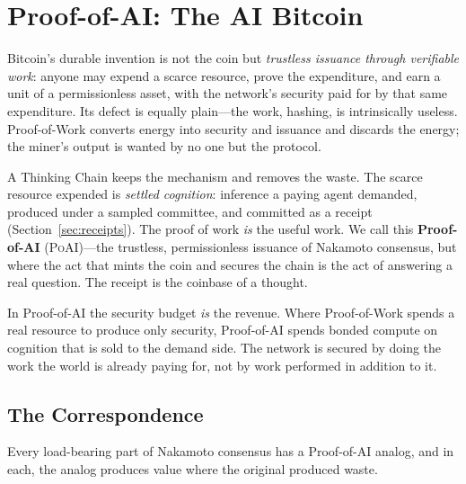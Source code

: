 \section{Proof-of-AI: The AI Bitcoin}
\label{sec:ai-bitcoin}
\providecommand{\PoAI}{\textsc{PoAI}}

Bitcoin's durable invention is not the coin but \emph{trustless issuance through verifiable work}: anyone may expend a scarce resource, prove the expenditure, and earn a unit of a permissionless asset, with the network's security paid for by that same expenditure. Its defect is equally plain---the work, hashing, is intrinsically useless. Proof-of-Work converts energy into security and issuance and discards the energy; the miner's output is wanted by no one but the protocol.

A Thinking Chain keeps the mechanism and removes the waste. The scarce resource expended is \emph{settled cognition}: inference a paying agent demanded, produced under a sampled committee, and committed as a \PoT{} receipt (Section~\ref{sec:receipts}). The proof of work \emph{is} the useful work. We call this \textbf{Proof-of-AI} (\PoAI{})---the trustless, permissionless issuance of Nakamoto consensus, but where the act that mints the coin and secures the chain is the act of answering a real question. The receipt is the coinbase of a thought.

\begin{principle}[Proof-of-AI]
\label{prin:poai}
In Proof-of-AI the security budget \emph{is} the revenue. Where Proof-of-Work spends a real resource to produce only security, Proof-of-AI spends bonded compute on cognition that is sold to the demand side. The network is secured by doing the work the world is already paying for, not by work performed in addition to it.
\end{principle}

\subsection{The Correspondence}

Every load-bearing part of Nakamoto consensus has a Proof-of-AI analog, and in each, the analog produces value where the original produced waste.


